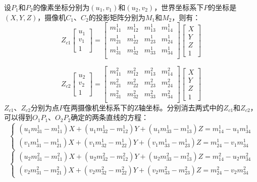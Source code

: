 设$P_1$和$P_2$的像素坐标分别为$(u_1, v_1)$和$(u_2, v_2)$，世界坐标系下$P$的坐标是$(X, Y, Z)$，摄像机$C_1$、$C_2$的投影矩阵分别为$M_1$和$M_2$，则有：
%
\begin{equation}\label{eq:2_3_0}
Z_{c1}
\begin{bmatrix}
u_1 \\ v_1 \\ 1
\end{bmatrix}
=
\begin{bmatrix}
m_{11}^1 & m_{12}^1 & m_{13}^1 & m_{14}^1 \\
m_{21}^1 & m_{22}^1 & m_{23}^1 & m_{24}^1 \\
m_{31}^1 & m_{32}^1 & m_{33}^1 & m_{34}^1 \\
\end{bmatrix}
\begin{bmatrix}
X \\ Y \\ Z \\ 1
\end{bmatrix}
\end{equation}

\begin{equation}\label{eq:2_3_1}
Z_{c2}
\begin{bmatrix}
u_2 \\ v_2 \\ 1
\end{bmatrix}
=
\begin{bmatrix}
m_{11}^2 & m_{12}^2 & m_{13}^2 & m_{14}^2 \\
m_{21}^2 & m_{22}^2 & m_{23}^2 & m_{24}^2 \\
m_{31}^2 & m_{32}^2 & m_{33}^2 & m_{34}^2 \\
\end{bmatrix}
\begin{bmatrix}
X \\ Y \\ Z \\ 1
\end{bmatrix}
\end{equation}
$Z_{c1}$、$Z_{c2}$分别为点$P$在两摄像机坐标系下的Z轴坐标。分别消去两式中的$Z_{c1}$和$Z_{c2}$，可以得到$O_1P_1$、$O_2P_2$确定的两条直线的方程：
%
\begin{equation}\label{eq:2_3_2}
\begin{cases}
(u_1 m_{31}^1 - m_{11}^1) X + (u_1 m_{32}^1 - m_{12}^1) Y + (u_1 m_{33}^1 - m_{13}^1) Z = m_{14}^1 - u_1 m_{34}^1 \\
(v_1 m_{31}^1 - m_{21}^1) X + (v_1 m_{32}^1 - m_{22}^1) Y + (v_1 m_{33}^1 - m_{23}^1) Z = m_{24}^1 - v_1 m_{34}^1
\end{cases}
\end{equation}
\begin{equation}\label{eq:2_3_3}
\begin{cases}
(u_2 m_{31}^2 - m_{11}^2) X + (u_2 m_{32}^2 - m_{12}^2) Y + (u_2 m_{33}^2 - m_{13}^2) Z = m_{14}^2 - u_2 m_{34}^2 \\
(v_2 m_{31}^2 - m_{21}^2) X + (v_2 m_{32}^2 - m_{22}^2) Y + (v_2 m_{33}^2 - m_{23}^2) Z = m_{24}^2 - v_2 m_{34}^2
\end{cases}
\end{equation}

